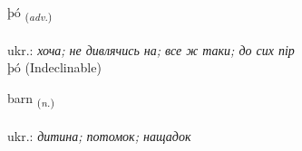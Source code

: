\documentclass[frontgrid, backgrid]{flacards}\usepackage[]{graphicx}\usepackage[]{xcolor}
\begin{document}
\renewcommand{\flhead}{\vskip5pt \fboxsep=0pt {\small\bfseries\footnotesize Atviksorð | прислівник}}
\renewcommand{\fcfoot}{\vskip5pt \fboxsep=0pt \hspace{2pt}{\small\bfseries\footnotesize 1K}}

\renewcommand{\blhead}{\vskip5pt {\small\bfseries\footnotesize Atviksorð | прислівник }}
\renewcommand{\bcfoot}{\vskip5pt \hspace{2pt}{\small\bfseries\footnotesize 1K}}


{þó \small{\textsubscript{(\textit{adv.})}} \\[1ex]
\textphonetic{[θouː]} \\
ukr.: \emph{хоча; не дивлячись на; все ж таки; до сих пір} \\  [2ex]
þó (Indeclinable)}

\renewcommand{\flhead}{\vskip5pt \fboxsep=0pt {\small\bfseries\footnotesize Nafnorð | іменник}}
\renewcommand{\fcfoot}{\vskip5pt \fboxsep=0pt \hspace{2pt}{\small\bfseries\footnotesize 1K}}

\renewcommand{\blhead}{\vskip5pt {\small\bfseries\footnotesize Nafnorð | іменник }}
\renewcommand{\bcfoot}{\vskip5pt \hspace{2pt}{\small\bfseries\footnotesize 1K}}


{barn \small{\textsubscript{(\textit{n.})}} \\[1ex] %
\textphonetic{[partn̥]} \\
ukr.: \emph{дитина; потомок; нащадок} \\  [2ex]
\renewcommand*{\arraystretch}{0.8}
}

\renewcommand{\flhead}{\vskip5pt \fboxsep=0pt {\small\bfseries\footnotesize Sagnorð | дієслово}}
\renewcommand{\fcfoot}{\vskip5pt \fboxsep=0pt \hspace{2pt}{\small\bfseries\footnotesize 1K}}
\end{document}
